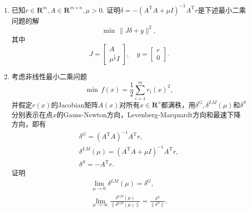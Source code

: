 \begin{enumerate}
    \omitted
    \item 已知$r \in \textbf{R}^m, A \in \textbf{R}^{m \times n},\mu>0$. 证明$\delta=-(A^{\mathrm{T}}A+\mu I)^{-1}A^{\mathrm{T}}r$是下述最小二乘问题的解\[\min \, \|J\delta+y\|^2,\]其中\[J=\begin{bmatrix}
        A \\ \mu^{\frac{1}{2}}I
    \end{bmatrix}, \quad y=\begin{bmatrix}
        r\\0
    \end{bmatrix}.\]
    \omitted
    \item 考虑非线性最小二乘问题\[\min \, f(x)=\frac{1}{2}\sum_{i=1}^m r_i(x)^2,\]并假定$r(x)$的Jacobian矩阵$A(x)$对所有$x \in \textbf{R}^n$都满秩，用$\delta^G,\delta^{LM}(\mu)$和$\delta^S$分别表示在点$x$的Gauss-Newton方向，Levenberg-Marquardt方向和最速下降方向，即有
    \[\begin{array}{cc}
        \delta^G=(A^{\mathrm{T}}A)^{-1}A^{\mathrm{T}}r,\\
        \delta^{LM}(\mu)=(A^{\mathrm{T}}A+\mu I)^{-1}A^{\mathrm{T}}r,\\
        \delta^S=-A^{\mathrm{T}}r.
    \end{array}\]
    证明
    \[\begin{array}{cc}
        \lim\limits_{\mu \to 0}\delta^{LM}(\mu)=\delta^G,\\
        \displaystyle\lim\limits_{\mu \to \infty} \frac{\delta^{LM}(\mu)}{\|\delta^{LM}(\mu)\|}=\frac{\delta^S}{\|\delta^S\|}.
    \end{array}\]
    \omitted
\end{enumerate}
\clearpage
